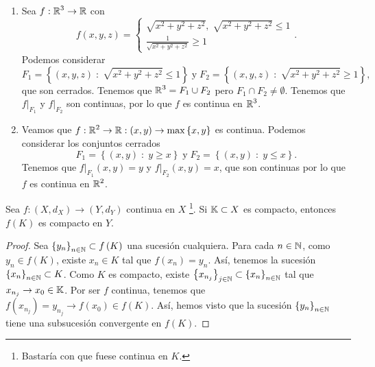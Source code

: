 \begin{eg}
\begin{enumerate}
\item Sea $\displaystyle f : \mathbb{R}^{3} \to \mathbb{R} $ con 
	\[ f\left(x,y,z\right) = 
	\begin{cases}
	\sqrt{x^{2}+y^{2}+z^{2}}, \; \sqrt{x^{2}+y^{2}+z^{2}}\leq 1 \\
	\frac{1}{\sqrt{x^{2}+y^{2}+z^{2}}} \geq 1
	\end{cases}
	.\]
	Podemos considerar 
	\[ \displaystyle F_{1} = \left\{ \left(x,y,z\right) \; : \; \sqrt{x^{2}+y^{2}+z^{2}}\leq 1\right\} \; \text{y} \; F_{2} = \left\{ \left(x,y,z\right) \; : \; \sqrt{x^{2}+y^{2}+z^{2}} \geq 1\right\},\]
	que son cerrados. Tenemos que $\displaystyle \mathbb{R}^{3} = F_{1} \cup F_{2} $ pero $\displaystyle F_{1} \cap F_{2} \neq \emptyset $. Tenemos que $\displaystyle f|_{F_{1}} $ y $\displaystyle f|_{F_{2}} $ son continuas, por lo que $\displaystyle f $ es continua en $\displaystyle \mathbb{R}^{3} $.
\item Veamos que $\displaystyle f : \mathbb{R}^{2} \to \mathbb{R} : \left(x,y\right) \to \max \left\{ x,y\right\}  $ es continua. Podemos considerar los conjuntos cerrados
	\[F_{1} = \left\{ \left(x,y\right) \; : \; y \geq x\right\} \; \text{y} \; F_{2} = \left\{ \left(x,y\right) \; : \; y \leq x\right\}  .\]
	Tenemos que $\displaystyle f|_{F_{1}}\left(x,y\right) = y $ y $\displaystyle f|_{F_{2}} \left(x,y\right) = x $, que son continuas por lo que $\displaystyle f $ es continua en $\displaystyle \mathbb{R}^{2} $.
\end{enumerate}
\end{eg}
\begin{theorem}
Sea $\displaystyle f : \left(X, d _{X}\right) \to \left(Y, d _{Y}\right) $ continua en $\displaystyle X $ \footnote{Bastaría con que fuese continua en $\displaystyle K $.}. Si $\displaystyle \mathbb{K} \subset X $ es compacto, entonces $\displaystyle f\left(K\right) $ es compacto en $\displaystyle Y $.
\end{theorem}
\begin{proof}
	Sea $\displaystyle \left\{ y_{n}\right\} _{n\in\mathbb{N}}\subset f\left(K\right) $ una sucesión cualquiera. Para cada $\displaystyle n \in \mathbb{N} $, como $\displaystyle y_{n} \in f\left(K\right) $, existe $\displaystyle x_{n} \in K $ tal que $\displaystyle f\left(x_{n}\right) = y_{n} $. Así, tenemos la sucesión $\displaystyle \left\{ x_{n}\right\} _{n\in\mathbb{N}} \subset K $. Como $\displaystyle K $ es compacto, existe $\displaystyle \left\{ x_{n_{j}}\right\} _{j \in \mathbb{N}} \subset \left\{ x_{n}\right\} _{n\in\mathbb{N}} $ tal que $\displaystyle x_{n_{j}} \to x_{0} \in \mathbb{K} $. Por ser $\displaystyle f $ continua, tenemos que $\displaystyle f\left(x_{n_{j}}\right) = y_{n_{j}} \to f\left(x_{0}\right) \in f\left(K\right) $.
	Así, hemos visto que la sucesión $\displaystyle \left\{ y_{n}\right\} _{n\in\mathbb{N}} $ tiene una subsucesión convergente en $\displaystyle f\left(K\right) $.
\end{proof}
